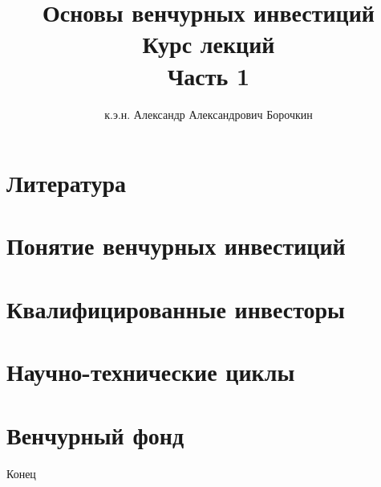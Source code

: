 \documentclass[12pt]{beamer}
\title[Основы венчурных инвестиций]{Основы венчурных инвестиций\\Курс лекций\\Часть 1}
\author{к.э.н. Александр Александрович Борочкин}
\institute{Нижегородский государственный университет}
\date{\the\year}
\begin{document}
\begin{frame}
\titlepage
\end{frame}

%
\section*{Литература}


\section{Понятие венчурных инвестиций}


\section{Квалифицированные инвесторы}


\section{Научно-технические циклы}


\section{Венчурный фонд}


\begin{frame}
\begin{center}
\huge{Конец}
\end{center}
\end{frame}
\end{document}
